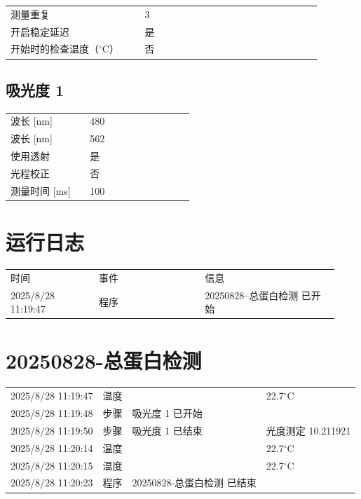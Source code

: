 \documentclass[UTF8,10pt,a4paper,fontset=fandol]{ctexart}
\begin{document}
\begin{tabular}{p{0.38\linewidth}p{0.50\linewidth}}
测量重复 & 3\\
开启稳定延迟 & 是\\
开始时的检查温度（$^\circ$C） & 否
\end{tabular}

\subsection*{吸光度 1}

\begin{tabular}{p{0.38\linewidth}p{0.50\linewidth}}
波长 [nm] & 480\\
波长 [nm] & 562\\
使用透射 & 是\\
光程校正 & 否\\
测量时间 [ms] & 100
\end{tabular}

\section*{运行日志}

\begin{tabular}{p{0.25\linewidth}p{0.30\linewidth}p{0.38\linewidth}}
时间 & 事件 & 信息\\
2025/8/28 11:19:47 & 程序 & 20250828--总蛋白检测 已开始
\end{tabular}

\newpage

\section*{20250828-总蛋白检测}

\begin{tabular}{@{}llll@{}}
2025/8/28 11:19:47 & 温度 & & 22.7$^\circ$C \\
2025/8/28 11:19:48 & 步骤 & 吸光度 1 已开始 & \\
2025/8/28 11:19:50 & 步骤 & 吸光度 1 已结束 & 光度测定 10.211921 \\
2025/8/28 11:20:14 & 温度 & & 22.7$^\circ$C \\
2025/8/28 11:20:15 & 温度 & & 22.7$^\circ$C \\
2025/8/28 11:20:23 & 程序 & 20250828-总蛋白检测 已结束 & \\
\end{tabular}
\end{document}
